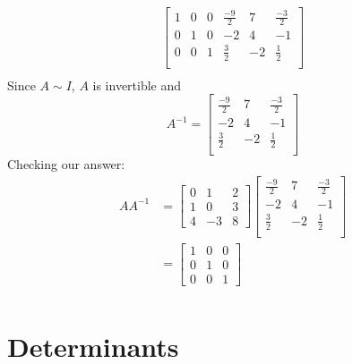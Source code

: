 \documentclass[12pt letter]{report}
\begin{document}
{{\begin{align*}
      \begin{bmatrix}
        1 & 0 & 0 & \frac{-9}{2} & 7  & \frac{-3}{2} \\
        0 & 1 & 0 & -2           & 4  & -1           \\
        0 & 0 & 1 & \frac{3}{2}  & -2 & \frac{1}{2}  \\
      \end{bmatrix}
      \\
    \end{align*}
    Since $A \sim I$, $A$ is invertible and
    \[
      A^{-1}= \begin{bmatrix}
        \frac{-9}{2} & 7  & \frac{-3}{2} \\
        -2           & 4  & -1           \\
        \frac{3}{2}  & -2 & \frac{1}{2}  \\
      \end{bmatrix}
    \]
    Checking our answer:
    \begin{align*}
      A A^{-1} & = \begin{bmatrix}
                     0 & 1  & 2 \\
                     1 & 0  & 3 \\
                     4 & -3 & 8
                   \end{bmatrix} \begin{bmatrix}
                                   \frac{-9}{2} & 7  & \frac{-3}{2} \\
                                   -2           & 4  & -1           \\
                                   \frac{3}{2}  & -2 & \frac{1}{2}  \\
                                 \end{bmatrix} \\
               & = \begin{bmatrix}
                     1 & 0 & 0 \\
                     0 & 1 & 0 \\
                     0 & 0 & 1
                   \end{bmatrix}                                 \\
    \end{align*}
  }

}

\chapter{Determinants}
\end{document}
